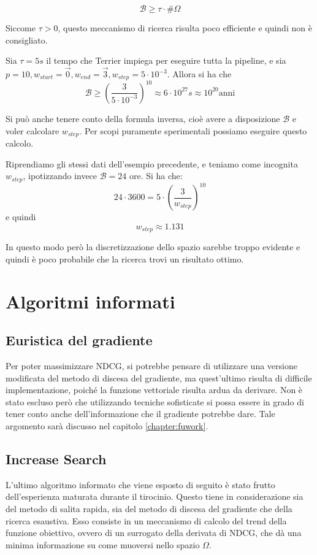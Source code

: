 $$
\mathcal{B} \geq \tau \cdot \#\Omega
$$

Siccome $\tau > 0$, questo meccanismo di ricerca risulta poco efficiente e quindi non è consigliato.

\begin{esempio}\label{ex:gsspace}
	Sia $\tau = 5s$ il tempo che Terrier impiega per eseguire tutta la pipeline, e sia $p=10, w_{start} = \vec{0}, w_{end} = \vec{3}, w_{step} = 5 \cdot 10^{-3}$.
	Allora si ha che
	$$
	\mathcal{B} \geq \left(\frac{3}{5 \cdot 10^{-3}}\right)^{10} \approx 6 \cdot 10^{27}s \approx 10^{20} \text{anni}
	$$
\end{esempio}


\begin{esempio}
	Si può anche tenere conto della formula inversa, cioè avere a disposizione $\mathcal{B}$ e voler
	calcolare $w_{step}$. Per scopi puramente sperimentali possiamo eseguire questo calcolo.
	
	Riprendiamo gli stessi dati dell'esempio precedente, e teniamo come incognita $w_{step}$, ipotizzando
	invece $\mathcal{B} = 24$ ore.
	Si ha che:
	$$
	24 \cdot 3600 = 5 \cdot \left(\frac{3}{w_{step}}\right)^{10}
	$$
	e quindi
	$$
	w_{step} \approx 1.131
	$$
	
	In questo modo però la discretizzazione dello spazio sarebbe troppo evidente e quindi è poco
	probabile che la ricerca trovi un risultato ottimo.
\end{esempio}

\section{Algoritmi informati}

\subsection{Euristica del gradiente}
Per poter massimizzare NDCG, si potrebbe pensare di utilizzare una versione
modificata del metodo di discesa del gradiente,
ma quest'ultimo risulta di difficile implementazione, poiché la funzione vettoriale
risulta ardua da derivare. Non è stato escluso però che utilizzando tecniche
sofisticate si possa essere in grado di tener conto anche dell'informazione
che il gradiente potrebbe dare.
Tale argomento sarà discusso nel capitolo \ref{chapter:fuwork}.

\subsection{Increase Search}
L'ultimo algoritmo informato che viene esposto di seguito è stato
frutto dell'esperienza maturata durante il tirocinio. Questo
tiene in considerazione sia del metodo di salita rapida,
sia del metodo di discesa del gradiente che della ricerca esaustiva. 
Esso consiste in un meccanismo di calcolo del trend della funzione obiettivo,
ovvero di un surrogato della derivata di NDCG, che dà una minima informazione su come
muoversi nello spazio $\Omega$.

